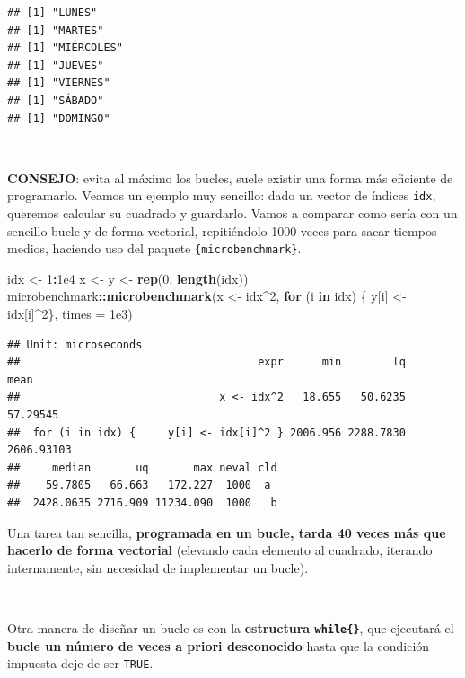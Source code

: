 \documentclass[11pt,]{book}
\newenvironment{Shaded}{\begin{snugshade}}{\end{snugshade}}
\newcommand{\ControlFlowTok}[1]{\textcolor[rgb]{0.27,0.27,0.27}{\textbf{#1}}}
\newcommand{\DataTypeTok}[1]{\textcolor[rgb]{0.27,0.27,0.27}{#1}}
\newcommand{\DecValTok}[1]{\textcolor[rgb]{0.06,0.06,0.06}{#1}}
\newcommand{\FloatTok}[1]{\textcolor[rgb]{0.06,0.06,0.06}{#1}}
\newcommand{\KeywordTok}[1]{\textcolor[rgb]{0.27,0.27,0.27}{\textbf{#1}}}
\newcommand{\NormalTok}[1]{#1}
\newcommand{\OperatorTok}[1]{\textcolor[rgb]{0.43,0.43,0.43}{\textbf{#1}}}
\newcommand{\StringTok}[1]{\textcolor[rgb]{0.5,0.5,0.5}{#1}}
\begin{document}
\begin{verbatim}
## [1] "LUNES"
## [1] "MARTES"
## [1] "MIÉRCOLES"
## [1] "JUEVES"
## [1] "VIERNES"
## [1] "SÁBADO"
## [1] "DOMINGO"
\end{verbatim}

~

\textbf{CONSEJO}: evita al máximo los bucles, suele existir una forma más eficiente de programarlo. Veamos un ejemplo muy sencillo: dado un vector de índices \texttt{idx}, queremos calcular su cuadrado y guardarlo. Vamos a comparar como sería con un sencillo bucle y de forma vectorial, repitiéndolo 1000 veces para sacar tiempos medios, haciendo uso del paquete \texttt{\{microbenchmark\}}.

\begin{Shaded}
\begin{Highlighting}[]
\NormalTok{idx <-}\StringTok{ }\DecValTok{1}\OperatorTok{:}\FloatTok{1e4}
\NormalTok{x <-}\StringTok{ }\NormalTok{y <-}\StringTok{ }\KeywordTok{rep}\NormalTok{(}\DecValTok{0}\NormalTok{, }\KeywordTok{length}\NormalTok{(idx))}
\NormalTok{microbenchmark}\OperatorTok{::}\KeywordTok{microbenchmark}\NormalTok{(x <-}\StringTok{ }\NormalTok{idx}\OperatorTok{^}\DecValTok{2}\NormalTok{, }
                               \ControlFlowTok{for}\NormalTok{ (i }\ControlFlowTok{in}\NormalTok{ idx) \{  y[i] <-}\StringTok{ }\NormalTok{idx[i]}\OperatorTok{^}\DecValTok{2}\NormalTok{\},}
                               \DataTypeTok{times =} \FloatTok{1e3}\NormalTok{)}
\end{Highlighting}
\end{Shaded}

\begin{verbatim}
## Unit: microseconds
##                                     expr      min        lq       mean
##                               x <- idx^2   18.655   50.6235   57.29545
##  for (i in idx) {     y[i] <- idx[i]^2 } 2006.956 2288.7830 2606.93103
##     median       uq       max neval cld
##    59.7805   66.663   172.227  1000  a 
##  2428.0635 2716.909 11234.090  1000   b
\end{verbatim}

Una tarea tan sencilla, \textbf{programada en un bucle, tarda 40 veces más que hacerlo de forma vectorial} (elevando cada elemento al cuadrado, iterando internamente, sin necesidad de implementar un bucle).

~

Otra manera de diseñar un bucle es con la \textbf{estructura \texttt{while\{\}}}, que ejecutará el \textbf{bucle un número de veces a priori desconocido} hasta que la condición impuesta deje de ser \texttt{TRUE}.
\end{document}

